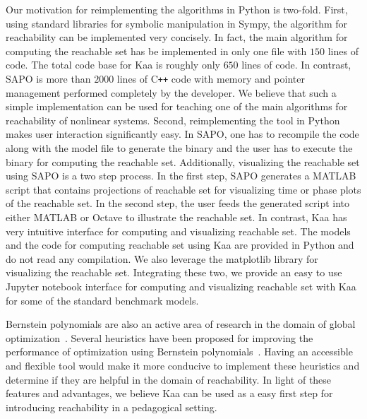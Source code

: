 \documentclass[EPiC]{easychair}
\begin{document}
%
Our motivation for reimplementing the algorithms in Python is two-fold.
%
First, using standard libraries for symbolic manipulation in Sympy, the algorithm for reachability can be implemented very concisely.
%
In fact, the main algorithm for computing the reachable set has be implemented in only one file with $150$ lines of code.
%
The total code base for Kaa is roughly only $650$ lines of code.
%
%
In contrast, SAPO is more than $2000$ lines of C\texttt{++} code with memory and pointer management performed completely by the developer.
%
We believe that such a simple implementation can be used for teaching one of the main algorithms for reachability of nonlinear systems.
%
Second, reimplementing the tool in Python makes user interaction significantly easy. 
%
In SAPO, one has to recompile the code along with the model file to generate the binary and the user has to execute the binary for computing the reachable set.
%
Additionally, visualizing the reachable set using SAPO is a two step process. In the first step, SAPO generates a MATLAB script that contains projections of reachable set for visualizing time or phase plots of the reachable set. In the second step, the user feeds the generated script into either MATLAB or Octave to illustrate the reachable set. 
%
In contrast, Kaa has very intuitive interface for computing and visualizing reachable set.
%
The models and the code for computing reachable set using Kaa are provided in Python and do not read any compilation. 
%
We also leverage the matplotlib library for visualizing the reachable set. 
%
Integrating these two, we provide an easy to use Jupyter notebook interface for computing and visualizing reachable set with Kaa for some of the standard benchmark models.
%
%
%

Bernstein polynomials are also an active area of research in the domain of global optimization~\cite{nataray2002algorithm,garloff2003bernstein,nataraj2007new}.
%
Several heuristics have been proposed for improving the performance of optimization using Bernstein polynomials~\cite{kodiak,smith2009fast,munoz2013formalization}. 
%
%
Having an accessible and flexible tool would make it more conducive to implement these heuristics and determine if they are helpful in the domain of reachability.
%
In light of these features and advantages, we believe Kaa can be used as a easy first step for introducing reachability in a pedagogical setting.
\end{document}
